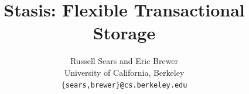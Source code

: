 \documentclass[letterpaper,twocolumn,10pt]{article}
\newcommand{\yad}{Stasis\xspace}
\newcommand{\rcs}[1]{\textcolor{green}{\bf RCS: #1}}
\begin{document}
\date{}



\title{\Large \bf \yad: Flexible Transactional Storage}

\author{
{\rm Russell Sears and Eric Brewer} \\
{\small University of California, Berkeley}\\
{\small\tt \{sears,brewer\}@cs.berkeley.edu} 
} %

\maketitle


\thispagestyle{empty}

\end{document}

